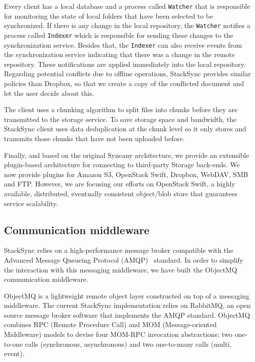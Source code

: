 Every client has a local database and a process called \texttt{Watcher} that is responsible for monitoring the state of local folders that have been selected to be synchronized. If there is any change in the local repository, the \texttt{Watcher} notifies a process called \texttt{Indexer} which is responsible for sending these changes to the synchronization service. Besides that, the \texttt{Indexer} can also receive events from the synchronization service indicating that there was a change in the remote repository. These notifications are applied immediately into the local repository. Regarding potential
conflicts due to offline operations, StackSync provides similar policies than Dropbox, so that we create a copy of the conflicted document and let the user decide about this.


The client uses a chunking algorithm to split files into chunks before they are transmitted to the storage service. To save storage space and bandwidth, the StackSync client uses data deduplication at the chunk level so it only stores and transmits those chunks that have not been uploaded before. 


Finally, and based on the original Syncany architecture, we provide an extensible plugin-based architecture for connecting to third-party Storage back-ends. We now provide plugins for Amazon S3, OpenStack Swift, Dropbox, WebDAV, SMB and FTP. However, we are focusing our efforts on OpenStack Swift, a highly available, distributed, eventually consistent object/blob store that guarantees service scalability.


\subsection{Communication middleware}

StackSync relies on a high-performance message broker compatible with the Advanced Message Queueing Protocol (AMQP)~\cite{amqp} standard. In order to simplify the interaction with this messaging middleware, we have built the ObjectMQ communication middleware.


ObjectMQ is a lightweight remote object layer constructed on top of a messaging
middleware. The current StackSync implementation relies on RabbitMQ, an open source message broker software that implements the AMQP standard. ObjectMQ combines RPC (Remote Procedure Call) and MOM (Message-oriented Middleware) models to devise four MOM-RPC invocation abstractions: two one-to-one calls (synchronous, asynchronous) and two one-to-many calls (multi, event).



